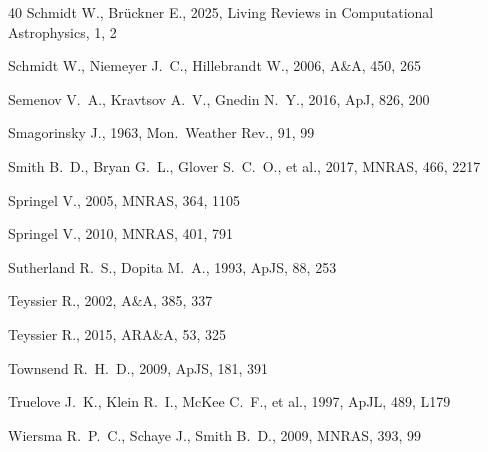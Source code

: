 \documentclass[fleqn,usenatbib]{mnras}
\begin{document}
\begin{thebibliography}{40}
Schmidt W., Br\"uckner E., 2025, Living Reviews in Computational Astrophysics, 1, 2

Schmidt W., Niemeyer J.~C., Hillebrandt W., 2006, A\&A, 450, 265

Semenov V.~A., Kravtsov A.~V., Gnedin N.~Y., 2016, ApJ, 826, 200

Smagorinsky J., 1963, Mon.\ Weather Rev., 91, 99

Smith B.~D., Bryan G.~L., Glover S.~C.~O., et al., 2017, MNRAS, 466, 2217

Springel V., 2005, MNRAS, 364, 1105

Springel V., 2010, MNRAS, 401, 791

Sutherland R.~S., Dopita M.~A., 1993, ApJS, 88, 253

Teyssier R., 2002, A\&A, 385, 337

Teyssier R., 2015, ARA\&A, 53, 325

Townsend R.~H.~D., 2009, ApJS, 181, 391

Truelove J.~K., Klein R.~I., McKee C.~F., et al., 1997, ApJL, 489, L179

Wiersma R.~P.~C., Schaye J., Smith B.~D., 2009, MNRAS, 393, 99

\end{thebibliography}

\bsp
\label{lastpage}
\end{document}
